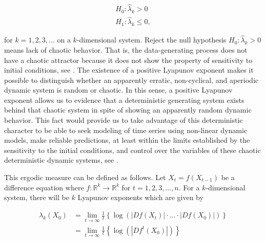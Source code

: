 \begin{equation}
\begin{array}{*{20}{c}}
  {{H_0}:{{\hat \lambda }_k} > 0} \\ 
  {{H_1}:{{\hat \lambda }_k} \leqslant 0},
\end{array}
\label{eq0}
\end{equation}

\noindent for $k = 1,2,3, \ldots$ on a $k$-dimensional system. Reject the null hypothesis ${H_0}:{{\hat \lambda }_k} > 0$ means lack of chaotic behavior. That is, the data-generating process does not have a chaotic attractor because it does not show the property of sensitivity to initial conditions, see \cite{Gencay1992}. The existence of a positive Lyapunov exponent makes it possible to distinguish whether an apparently erratic, non-cyclical, and aperiodic dynamic system is random or chaotic. In this sense, a positive Lyapunov exponent allows us to evidence that a deterministic generating system exists behind that chaotic system in spite of showing an apparently random dynamic behavior. This fact would provide us to take advantage of this deterministic character to be able to seek modeling of time series using non-linear dynamic models, make reliable predictions, at least within the limits established by the sensitivity to the initial conditions, and control over the variables of these chaotic deterministic dynamic systems, see \cite{Diaz2019}.

This ergodic measure can be defined as follows. Let ${{X_t}} = f\left( {X_{t - 1}} \right)$ be a difference equation where $f:{\mathbb{R}^{k}} \to {\mathbb{R}^{k}}$ for $t = 1,2,3, \ldots ,n$. For a $k$-dimensional system, there will be $k$ Lyapunov exponents which are given by

\begin{align}
{\lambda _k}\left( {{X_0}} \right) &= \mathop {\lim }\limits_{t \to \infty } \frac{1}{t}\left\{ {\log \left( {\left| {Df\left( {{X_t}} \right)} \right| \cdot  \ldots  \cdot \left| {Df\left( {{X_0}} \right)} \right|} \right)} \right\} \nonumber \\
          					&= \mathop {\lim }\limits_{t \to \infty } \frac{1}{t}\left\{ {\log \left( {\left| {D{f^t}\left( {{X_0}} \right)} \right|} \right)} \right\}
\label{eq1}
\end{align}

